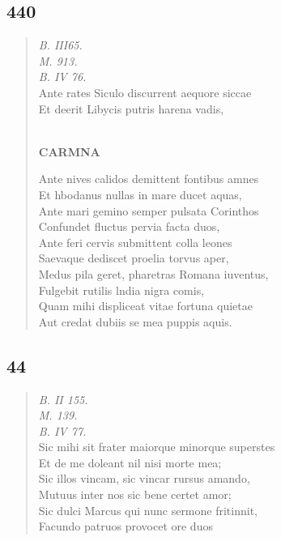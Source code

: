 \documentclass[11pt, a4paper]{report}
\begin{document}
            \subsection*{440}
      \begin{verse}
      \textit{B. III65.} \\ \textit{M. 913.} \\ \textit{B. IV 76.} \\ Ante rates Siculo discurrent aequore siccae \\ Et deerit Libycis putris harena vadis, \\ 
        ﻿\pagebreak 
     \marginpar{[332]} \begin{center} \textbf{CARMNA} \end{center}Ante nives calidos demittent fontibus amnes \\ Et hbodanus nullas in mare ducet aquas, \\ Ante mari gemino semper pulsata Corinthos \\ Confundet fluctus pervia facta duos, \\ Ante feri cervis submittent colla leones \\ Saevaque dediscet proelia torvus aper, \\ Medus pila geret, pharetras Romana iuventus, \\ Fulgebit rutilis lndia nigra comis, \\ Quam mihi displiceat vitae fortuna quietae \\ Aut credat dubiis se mea puppis aquis. \\ 
      \end{verse}
  
            \subsection*{44}
      \begin{verse}
      \textit{B. II 155.} \\ \textit{M. 139.} \\ \textit{B. IV 77.} \\ Sic mihi sit frater maiorque minorque superstes \\ Et de me doleant nil nisi morte mea; \\ Sic illos vincam, sic vincar rursus amando, \\ Mutuus inter nos sic bene certet amor; \\ Sic dulci Marcus qui nunc sermone fritinnit, \\ Facundo patruos provocet ore duos \\ 
      \end{verse}
  
\end{document}
